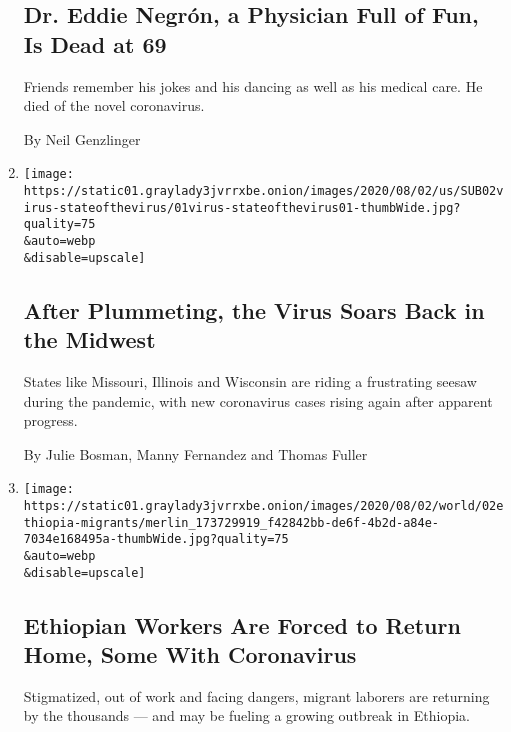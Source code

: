 \begin{enumerate}
  \hypertarget{dr-eddie-negruxf3n-a-physician-full-of-fun-is-dead-at-69}{%
  \subsection{Dr. Eddie Negrón, a Physician Full of Fun, Is Dead at
  69}\label{dr-eddie-negruxf3n-a-physician-full-of-fun-is-dead-at-69}}

  Friends remember his jokes and his dancing as well as his medical
  care. He died of the novel coronavirus.

  By Neil Genzlinger
\item
  \href{/2020/08/01/us/coronavirus-midwest-cases-deaths.html}{}

  \texttt{[image: https://static01.graylady3jvrrxbe.onion/images/2020/08/02/us/SUB02virus-stateofthevirus/01virus-stateofthevirus01-thumbWide.jpg?quality=75\\\&auto=webp\\\&disable=upscale]}

  \hypertarget{after-plummeting-the-virus-soars-back-in-the-midwest}{%
  \subsection{After Plummeting, the Virus Soars Back in the
  Midwest}\label{after-plummeting-the-virus-soars-back-in-the-midwest}}

  States like Missouri, Illinois and Wisconsin are riding a frustrating
  seesaw during the pandemic, with new coronavirus cases rising again
  after apparent progress.

  By Julie Bosman, Manny Fernandez and Thomas Fuller
\item
  \href{/2020/08/01/world/africa/ethiopian-migrant-workers-coronavirus.html}{}

  \texttt{[image: https://static01.graylady3jvrrxbe.onion/images/2020/08/02/world/02ethiopia-migrants/merlin\_173729919\_f42842bb-de6f-4b2d-a84e-7034e168495a-thumbWide.jpg?quality=75\\\&auto=webp\\\&disable=upscale]}

  \hypertarget{ethiopian-workers-are-forced-to-return-home-some-with-coronavirus}{%
  \subsection{Ethiopian Workers Are Forced to Return Home, Some With
  Coronavirus}\label{ethiopian-workers-are-forced-to-return-home-some-with-coronavirus}}

  Stigmatized, out of work and facing dangers, migrant laborers are
  returning by the thousands --- and may be fueling a growing outbreak
  in Ethiopia.


\end{enumerate}
